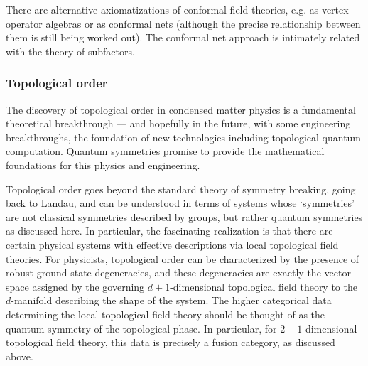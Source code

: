 \documentclass[11pt]{article}
\begin{document}
There are alternative axiomatizations of conformal field theories, e.g.  as
vertex operator algebras or as conformal nets (although the precise
relationship between them is still being worked out). The conformal net
approach is intimately related with the theory of subfactors. 


\subsubsection{Topological order}

The discovery of topological order in condensed matter physics is a
fundamental theoretical breakthrough --- and hopefully in the future, with
some engineering breakthroughs, the foundation of new technologies including
topological quantum computation. Quantum symmetries promise to provide the
mathematical foundations for this physics and engineering.

Topological order goes beyond the standard theory of symmetry breaking, going
back to Landau, and can be understood in terms of systems whose `symmetries'
are not classical symmetries described by groups, but rather quantum
symmetries as discussed here. In particular, the fascinating realization is
that there are certain physical systems with effective descriptions via local
topological field theories. For physicists, topological order can be
characterized by the presence of robust ground state degeneracies, and these
degeneracies are exactly the vector space assigned by the governing
$d+1$-dimensional topological field theory to the $d$-manifold describing the
shape of the system. The higher categorical data determining the local
topological field theory should be thought of as the quantum symmetry of the
topological phase. In particular, for $2+1$-dimensional topological field
theory, this data is precisely a fusion category, as discussed above.



\end{document}
